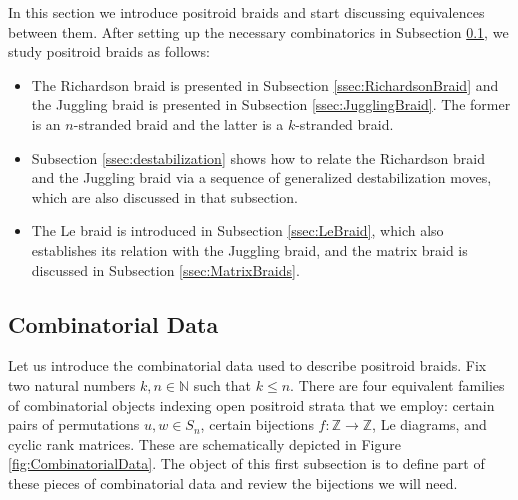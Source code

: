 \documentclass[10pt]{amsart}
\theoremstyle{plain}
\theoremstyle{definition}
\theoremstyle{remark}
\numberwithin{equation}{section}
\newcommand{\N}{\mathbb{N}}
\newcommand{\Z}{\mathbb{Z}}
\newcommand{\lr}{\longrightarrow}
\begin{document}
In this section we introduce positroid braids and start discussing equivalences between them. After setting up the necessary combinatorics in Subsection \ref{ssec:Comb}, we study positroid braids as follows:

\begin{itemize}
    \item[(i)] The Richardson braid is presented in Subsection \ref{ssec:RichardsonBraid} and the Juggling braid is presented in Subsection \ref{ssec:JugglingBraid}. The former is an $n$-stranded braid and the latter is a $k$-stranded braid.\\

    \item[(ii)] Subsection \ref{ssec:destabilization} shows how to relate the Richardson braid and the Juggling braid via a sequence of generalized destabilization moves, which are also discussed in that subsection.\\

    \item[(iii)] The Le braid is introduced in Subsection \ref{ssec:LeBraid}, which also establishes its relation with the Juggling braid, and the matrix braid is discussed in Subsection \ref{ssec:MatrixBraids}.
\end{itemize}


\subsection{Combinatorial Data}\label{ssec:Comb} Let us introduce the combinatorial data used to describe positroid braids. Fix two natural numbers $k,n\in\N$ such that $k\leq n$. There are four equivalent families of combinatorial objects indexing open positroid strata that we employ: certain pairs of permutations $u,w\in S_n$, certain bijections $f:\Z\lr\Z$, Le diagrams, and cyclic rank matrices. These are schematically depicted in Figure \ref{fig:CombinatorialData}. The object of this first subsection is to define part of these pieces of combinatorial data and review the bijections we will need. 
\end{document}
